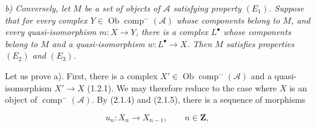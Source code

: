 \noindent\textit{b) Conversely, let $M$ be a set of objects of
$\mathcal A$ satisfying property $(E_1)$. Suppose that for every complex
$Y\in\operatorname{Ob}\operatorname{comp}^{-}(\mathcal A)$ whose
components belong to $M$, and every quasi-isomorphism
$m\colon X\longrightarrow Y$, there is a complex $L^\bullet$ whose
components belong to $M$ and a quasi-isomorphism
$w\colon L^\bullet\longrightarrow X$. Then $M$ satisfies properties
$(E_2)$ and $(E_3)$.}

Let us prove a). First, there is a complex
$X'\in\operatorname{Ob}\operatorname{comp}^{-}(\mathcal A)$ and a
quasi-isomorphism $X'\longrightarrow X$ (1.2.1). We may therefore reduce
to the case where $X$ is an object of
$\operatorname{comp}^{-}(\mathcal A)$. By (2.1.4) and (2.1.5), there is a
sequence of morphisms

\[
u_n\colon X_n\longrightarrow X_{n-1},
\qquad n\in\mathbf Z,
\]
\endgroup

